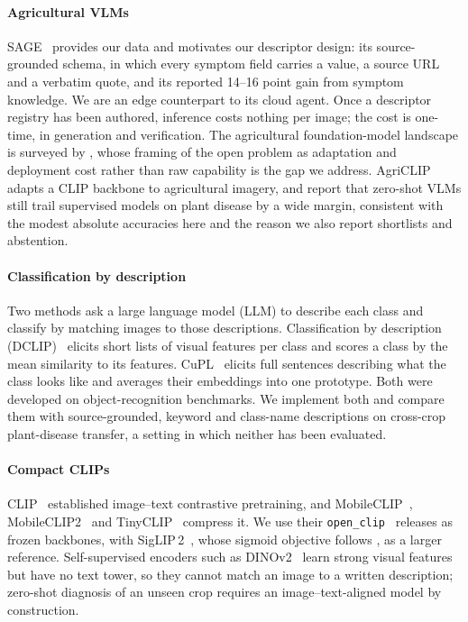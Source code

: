 \documentclass[a4paper,fleqn]{cas-dc}
\begin{document}
\paragraph{Agricultural VLMs} SAGE~\citep{arshad2026sage} provides our data and motivates our
descriptor design: its source-grounded schema, in which every symptom field carries a value, a source
URL and a verbatim quote, and its reported 14--16 point gain from symptom knowledge. We are an edge
counterpart to its cloud agent. Once a descriptor registry has been authored, inference costs
nothing per image; the cost is one-time, in generation and verification. The agricultural
foundation-model landscape is surveyed by \citet{chen2024foundation}, whose framing of the open
problem as adaptation and deployment cost rather than raw capability is the gap we address.
AgriCLIP~\citep{nawaz2024agriclip} adapts a CLIP backbone to agricultural imagery, and
\citet{lu2025vlmready} report that zero-shot VLMs still trail supervised models on plant disease by a
wide margin, consistent with the modest absolute accuracies here and the reason we also report
shortlists and abstention.

\paragraph{Classification by description} Two methods ask a large language model (LLM) to describe
each class and classify by matching images to those descriptions. Classification by description
(DCLIP)~\citep{menon2023} elicits short lists of visual features per class and scores a class by the
mean similarity to its features. CuPL~\citep{pratt2023} elicits full sentences describing what the
class looks like and averages their embeddings into one prototype. Both were developed on
object-recognition benchmarks. We implement both and compare them with source-grounded, keyword and
class-name descriptions on cross-crop plant-disease transfer, a setting in which neither has been
evaluated.

\paragraph{Compact CLIPs} CLIP~\citep{radford2021} established image--text contrastive pretraining,
and MobileCLIP~\citep{vasu2024}, MobileCLIP2~\citep{mobileclip2} and TinyCLIP~\citep{wu2023} compress
it. We use their \texttt{open\_clip}~\citep{ilharco2021} releases as frozen backbones, with
SigLIP\,2~\citep{siglip2}, whose sigmoid objective follows \citet{zhai2023}, as a larger reference.
Self-supervised encoders such as DINOv2~\citep{oquab2024} learn strong visual features but have no
text tower, so they cannot match an image to a written description; zero-shot diagnosis of an unseen
crop requires an image--text-aligned model by construction.
\end{document}
